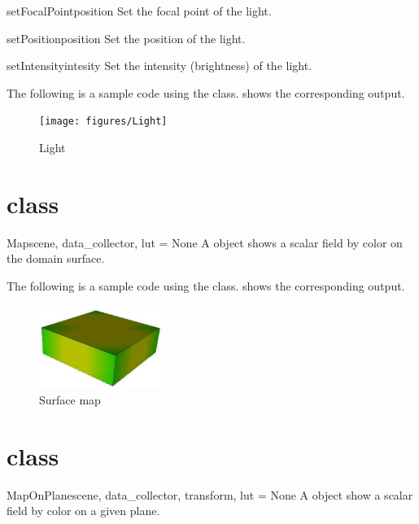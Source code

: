 \begin{methoddesc}[Light]{setFocalPoint}{position}
Set the focal point of the light.
\end{methoddesc}

\begin{methoddesc}[Light]{setPosition}{position}
Set the position of the light.
\end{methoddesc}

\begin{methoddesc}[Light]{setIntensity}{intesity}
Set the intensity (brightness) of the light.
\end{methoddesc}

The following is a sample code using the \Light class.
 shows the corresponding output.


\begin{figure}[ht]
\begin{center}
\texttt{[image: figures/Light]}
\end{center}
\caption{Light}
\label{fig:light.1}
\end{figure}

\section{\Map class}
\begin{classdesc}{Map}{scene, data_collector, lut = None}
A \Map object shows a scalar field by color on the domain surface.
\end{classdesc}

The following is a sample code using the \Map class. 
 shows the corresponding output. 


\begin{figure}[ht]
\begin{center}
\includegraphics[width=40mm]{figures/Map}
\end{center}
\caption{Surface map}
\label{fig:map.1}
\end{figure}

\section{\MapOnPlane class}
\begin{classdesc}{MapOnPlane}{scene, data_collector, transform, lut = None}
A \MapOnPlane object show a scalar field by color on a given plane.
\end{classdesc}

